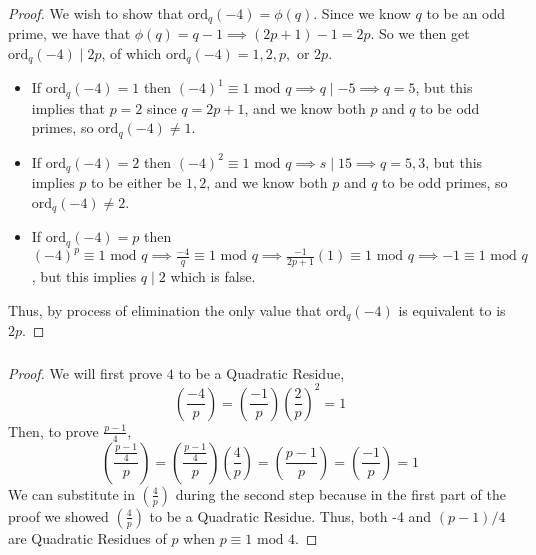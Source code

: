 \documentclass[class=article, crop=false]{standalone}
\def\ord{{\text{ord}}}
\def\leg#1#2{\left(\frac{#1}{#2}\right)}
\begin{document}
\subsubsection{}
\begin{proof}
	We wish to show that $\ord_q(-4)=\phi(q)$. Since we know $q$ to be an odd prime, we have that
	$\phi(q)=q-1\implies (2p+1)-1=2p$. So we then get $\ord_q(-4)\mid 2p$, of which $\ord_q(-4)=1,2,p,$ or $2p$.
	\begin{itemize}
		\item If $\ord_q(-4)=1$ then $(-4)^1\equiv 1\mbox{ mod }q \implies q\mid -5 \implies q=5$, but this implies that
		$p=2$ since $q=2p+1$, and we know both $p$ and $q$ to be odd primes, so $\ord_q(-4)\neq 1$.

		\item If $\ord_q(-4)=2$ then $(-4)^2\equiv 1\mbox{ mod }q \implies s\mid 15 \implies q=5,3$, but this implies
		$p$ to be either be $1,2$, and we know both $p$ and $q$ to be odd primes, so $\ord_q(-4)\neq 2$.

		\item If $\ord_q(-4)=p$ then $(-4)^p\equiv 1\mbox{ mod }q \implies \frac{-4}{q}\equiv 1\mbox{ mod }q \implies
		\frac{-1}{2p+1} (1) \equiv 1\mbox{ mod }q \implies -1\equiv 1\mbox{ mod }q$, but this implies $q\mid 2$ which
		is false.
	\end{itemize}
	Thus, by process of elimination the only value that $\ord_q(-4)$ is equivalent to is $2p$.
\end{proof}

\subsubsection{}
\begin{proof}
	We will first prove $4$ to be a Quadratic Residue,
	$$\leg{-4}{p} = \leg{-1}{p}\leg{2}{p}^2 = 1$$
	Then, to prove $\frac{p-1}{4}$,
	$$\leg{\frac{p-1}{4}}{p} = \leg{\frac{p-1}{4}}{p}\leg{4}{p} = \leg{p-1}{p} = \leg{-1}{p} = 1$$
	We can substitute in $\leg{4}{p}$ during the second step because in the first part of the proof
	we showed $\leg{4}{p}$ to be a Quadratic Residue. Thus, both -4 and $(p-1)/4$ are Quadratic Residues of $p$
	when $p\equiv 1\mbox{ mod }4$.
\end{proof}
\end{document}
